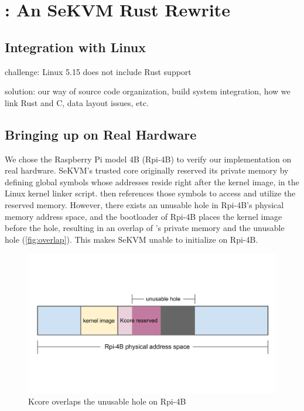 \chapter{\rustsec{}: An SeKVM Rust Rewrite}
\label{sec:migration}

\section{Integration with Linux}

challenge: Linux 5.15 does not include Rust support

solution: our way of source code organization, build system integration,
how we link Rust and C, data layout issues, etc.

\section{Bringing up \rustsec{} on Real Hardware}

We chose the Raspberry Pi model 4B (Rpi-4B) to verify our implementation on
real hardware.
SeKVM's trusted core \secore{} originally reserved its private memory by
defining global symbols whose addresses reside right after the kernel image,
in the Linux kernel linker script.
\secore{} then references those symbols to access and utilize the reserved
memory.
However, there exists an unusable hole in Rpi-4B's physical memory address
space, and the bootloader of Rpi-4B places the kernel image before the hole,
resulting in an overlap of \secore{}'s private memory and the unusable hole
(\autoref{fig:overlap}). This makes SeKVM unable to initialize on Rpi-4B.

\begin{figure}[hbtp]
    \includegraphics[scale=0.60]{figures/overlap.pdf}
    \caption{Kcore overlaps the unusable hole on Rpi-4B}
    \label{fig:overlap}
\end{figure}

